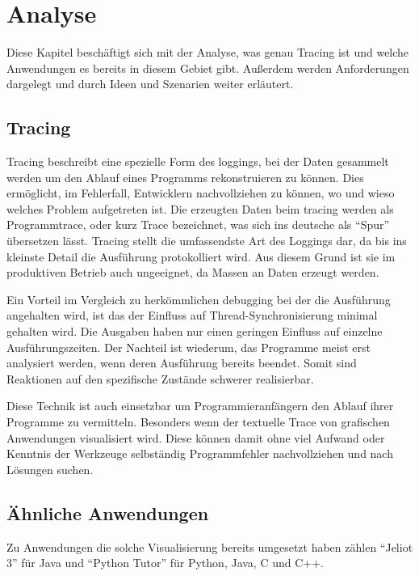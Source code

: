 
\chapter{Analyse}

Diese Kapitel beschäftigt sich mit der Analyse, was genau Tracing ist und welche Anwendungen es bereits in diesem Gebiet gibt. Außerdem werden Anforderungen dargelegt und durch Ideen und Szenarien weiter erläutert.

\section{Tracing} 

Tracing beschreibt eine spezielle Form des loggings, bei der Daten gesammelt werden um den Ablauf eines Programms rekonstruieren zu können. Dies ermöglicht, im Fehlerfall, Entwicklern nachvollziehen zu können, wo und wieso welches Problem aufgetreten ist. Die erzeugten Daten beim tracing werden als Programmtrace, oder kurz Trace bezeichnet, was sich ins deutsche als "`Spur"' übersetzen lässt. Tracing stellt die umfassendste Art des Loggings dar, da bis ins kleinste Detail die Ausführung protokolliert wird. Aus diesem Grund ist sie im produktiven Betrieb auch ungeeignet, da Massen an Daten erzeugt werden.

Ein Vorteil im Vergleich zu herkömmlichen debugging bei der die Ausführung angehalten wird, ist das der Einfluss auf Thread-Synchronisierung minimal gehalten wird. Die Ausgaben haben nur einen geringen Einfluss auf einzelne Ausführungszeiten. Der Nachteil ist wiederum, das Programme meist erst analysiert werden, wenn deren Ausführung bereits beendet. Somit sind Reaktionen auf den spezifische Zustände schwerer realisierbar.

Diese Technik ist auch einsetzbar um Programmieranfängern den Ablauf ihrer Programme zu vermitteln. Besonders wenn der textuelle Trace von grafischen Anwendungen visualisiert wird. Diese können damit ohne viel Aufwand oder Kenntnis der Werkzeuge selbständig Programmfehler nachvollziehen und nach Lösungen suchen.

\section{Ähnliche Anwendungen} 

Zu Anwendungen die solche Visualisierung bereits umgesetzt haben zählen "`Jeliot 3"' für Java und "`Python Tutor"' für Python, Java, C und C++.

